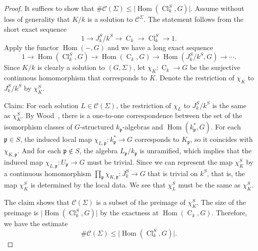 \documentclass[12pt,a4paper]{amsart}
\numberwithin{equation}{section}%
\theoremstyle{plain}%
\theoremstyle{definition}%
\theoremstyle{remark}%
\begin{document}
	\begin{proof}    	
		It suffices to show that $\#\mathcal{C}(\Sigma)\leq\lvert\operatorname{Hom}(\operatorname{Cl}^{S}_{k},G)\rvert$.
		Assume without loss of generality that $K/k$ is a solution to $\mathcal{C}^{\Sigma}$.
		The statement follows from the short exact sequence
		\begin{equation*}
			1\to J_k^{S}/k^{S}\to\operatorname{C}_k\to\operatorname{Cl}_k^{S}\to1.
		\end{equation*}
		Apply the functor $\operatorname{Hom}(\mathrm{-},G)$ and we have a long exact sequence
		\begin{equation*}
			1\to\operatorname{Hom}(\operatorname{Cl}_k^{S},G)\to\operatorname{Hom}(\operatorname{C}_k,G)\to\operatorname{Hom}(J_k^{S}/k^{S},G)\to\cdots.
		\end{equation*}
		Since $K/k$ is clearly a solution to $(G,\Sigma)$, let $\chi_K:\operatorname{C}_k\to G$ be the surjective continuous homomorphism that corresponds to $K$.
		Denote the restriction of $\chi_K$ to $J_k^S/k^S$ by $\chi_K^S$.
		
		Claim: For each solution $L\in\mathcal{C}(\Sigma)$, the restriction of $\chi_L$ to $J_k^S/k^S$ is the same as $\chi_K^S$.
		By Wood~\cite[Lemma 2.6]{wood2010probabilities}, there is a one-to-one correspondence between the set of the isomorphism classes of $G$-structured $k_{\mathfrak{p}}$-algebras and $\operatorname{Hom}(k_{\mathfrak{p}}^*,G)$.
		For each $\mathfrak{p}\in S$, the induced local map $\chi_{L,\mathfrak{p}}:k_{\mathfrak{p}}^*\to G$ corresponds to $K_{\mathfrak{p}}$, so it coincides with $\chi_{K,\mathfrak{p}}$.
		And for each $\mathfrak{p}\notin S$, the algebra $L_{\mathfrak{p}}/k_{\mathfrak{p}}$ is unramified, which implies that the induced map $\chi_{L,\mathfrak{p}}:U_{\mathfrak{p}}\to G$ must be trivial.
		Since we can represent the map $\chi_K^S$ by a continuous homomorphism $\prod_{\mathfrak{p}}\chi_{K,\mathfrak{p}}:J_k^S\to G$ that is trivial on $k^S$, that is, the map $\chi_K^S$ is determined by the local data.
		We see that $\chi_L^S$ must be the same as $\chi_K^S$.
		
		The claim shows that $\mathcal{C}(\Sigma)$ is a subset of the preimage of $\chi_{K}^S$.
		The size of the preimage is $\lvert\operatorname{Hom}(\operatorname{Cl}_k^S,G)\rvert$ by the exactness at $\operatorname{Hom}(\operatorname{C}_k,G)$.
		Therefore, we have the estimate
		\begin{equation*}
			\#\mathcal{C}(\Sigma)\leq\lvert\operatorname{Hom}(\operatorname{Cl}^{S}_{k},G)\rvert.
		\end{equation*}
	\end{proof}
\end{document}
